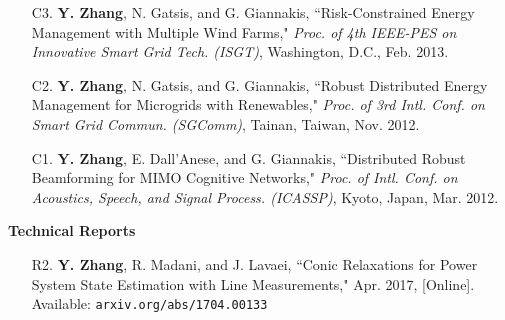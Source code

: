 \documentclass[margin,line]{res}
\begin{document}
\begin{resume}
\begin{enumerate}
\item[C3.] \textbf{Y. Zhang}, N. Gatsis, and G. Giannakis,
``Risk-Constrained Energy Management with Multiple Wind Farms,"
\emph{Proc. of 4th IEEE-PES on Innovative Smart Grid Tech. (ISGT)}, Washington, D.C., Feb. 2013.

\item[C2.] \textbf{Y. Zhang}, N. Gatsis, and G. Giannakis,
``Robust Distributed Energy Management for Microgrids with Renewables,"
\emph{Proc. of 3rd Intl. Conf. on Smart Grid Commun. (SGComm)}, Tainan, Taiwan, Nov. 2012.

\item[C1.] \textbf{Y. Zhang}, E. Dall'Anese, and G. Giannakis,
``Distributed Robust Beamforming for MIMO Cognitive Networks,"
\emph{Proc. of Intl. Conf. on Acoustics, Speech, and Signal Process. (ICASSP)}, Kyoto, Japan, Mar. 2012.
\end{enumerate}




%
%
%
%
%
%
%
%
%
%
%
%


{\bf Technical Reports}

\vspace{.2cm}

\begin{enumerate}

\item[R2.]	\textbf{Y. Zhang}, R. Madani, and J. Lavaei,
``Conic Relaxations for Power System State Estimation with Line Measurements,"
 Apr. 2017, [Online]. Available: \texttt{arxiv.org/abs/1704.00133}


\end{enumerate}
\end{resume}
\end{document}
